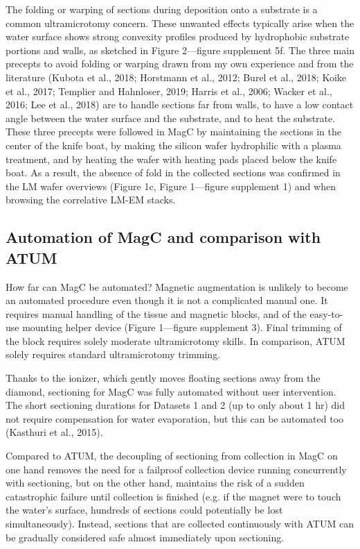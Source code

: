 \documentclass{article}
\begin{document}
The folding or warping of sections during deposition onto a substrate is a common ultramicrotomy concern. These unwanted effects typically arise when the water surface shows strong convexity profiles produced by hydrophobic substrate portions and walls, as sketched in Figure 2---figure supplement 5f. The three main precepts to avoid folding or warping drawn from my own experience and from the literature (Kubota et al., 2018; Horstmann et al., 2012; Burel et al., 2018; Koike et al., 2017; Templier and Hahnloser, 2019; Harris et al., 2006; Wacker et al., 2016; Lee et al., 2018) are to handle sections far from walls, to have a low contact angle between the water surface and the substrate, and to heat the substrate. These three precepts were followed in MagC by maintaining the sections in the center of the knife boat, by making the silicon wafer hydrophilic with a plasma treatment, and by heating the wafer with heating pads placed below the knife boat. As a result, the absence of fold in the collected sections was confirmed in the LM wafer overviews (Figure 1c, Figure 1---figure supplement 1) and when browsing the correlative LM-EM stacks.

\subsection*{Automation of MagC and comparison with ATUM}

How far can MagC be automated? Magnetic augmentation is unlikely to become an automated procedure even though it is not a complicated manual one. It requires manual handling of the tissue and magnetic blocks, and of the easy-to-use mounting helper device (Figure 1---figure supplement 3). Final trimming of the block requires solely moderate ultramicrotomy skills. In comparison, ATUM solely requires standard ultramicrotomy trimming.

Thanks to the ionizer, which gently moves floating sections away from the diamond, sectioning for MagC was fully automated without user intervention. The short sectioning durations for Datasets 1 and 2 (up to only about 1 hr) did not require compensation for water evaporation, but this can be automated too (Kasthuri et al., 2015).

Compared to ATUM, the decoupling of sectioning from collection in MagC on one hand removes the need for a failproof collection device running concurrently with sectioning, but on the other hand, maintains the risk of a sudden catastrophic failure until collection is finished (e.g. if the magnet were to touch the water’s surface, hundreds of sections could potentially be lost simultaneously). Instead, sections that are collected continuously with ATUM can be gradually considered safe almost immediately upon sectioning.
\end{document}
